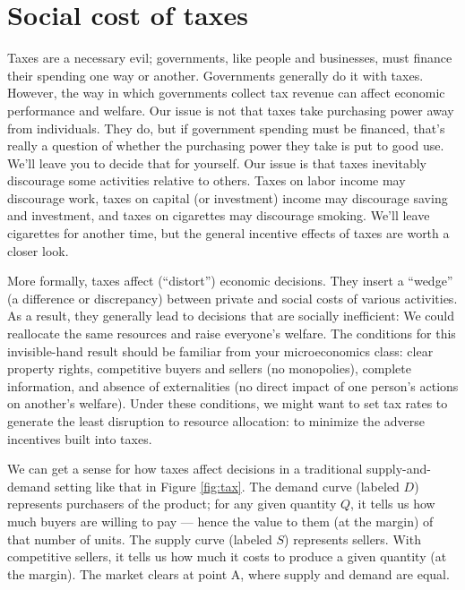 \section{Social cost of taxes}
\label{sec:triangle}

Taxes are a necessary evil;
governments, like people and businesses,
must finance their spending one way or another.
Governments generally do it with taxes.
However, the way in which governments collect tax revenue
can affect economic performance and welfare.
Our issue is not that taxes take purchasing power
away from individuals.
They do, but if government spending must be financed,
that's really a question of whether the purchasing power they take is put to good use.
We'll leave you to decide that for yourself.
Our issue is that taxes inevitably
discourage some activities relative to others.
Taxes on labor income may discourage work,
taxes on capital (or investment) income may discourage saving and investment,
and taxes on cigarettes may discourage smoking.
We'll leave cigarettes for another time,
but the general incentive effects of taxes are worth a closer look.

More formally,
taxes affect (``distort'') economic decisions.
They insert a ``wedge'' (a difference or discrepancy) between
private and social costs of various activities.
As a result, they generally lead to decisions that are socially inefficient:
We could reallocate the same resources and raise everyone's welfare.
The conditions for this invisible-hand result should be
familiar from your microeconomics class:
clear property rights,
competitive buyers and sellers (no monopolies),
complete information,
and absence of externalities
(no direct impact of one person's actions on another's welfare).
Under these conditions,
we might want to set tax rates
to generate the least disruption to resource allocation:
to minimize the adverse incentives built into taxes.

We can get a sense for how taxes affect decisions
in a traditional supply-and-demand setting like that
in Figure \ref{fig:tax}.
The demand curve (labeled $D$) represents purchasers of the product;
for any given quantity $Q$, it tells us how much buyers are willing to
pay --- hence the value to them (at the margin) of that number of units.
The supply curve (labeled $S$) represents sellers.
With competitive sellers, it tells us how much it costs to produce
a given quantity (at the margin).
The market clears at point A, where supply and demand are equal.

